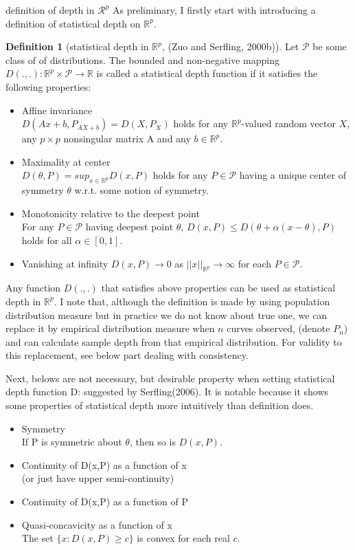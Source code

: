 \documentclass[aspectratio=169,ignorenonframetext,9pt]{beamer}
\theoremstyle{plain}
\theoremstyle{definition}
\newtheorem{defn}{Definition}[section]
\begin{document}
\begin{frame}{definition of depth in $\mathcal{R}^p$}
As preliminary, I firstly start with introducing a definition of statistical depth on $\mathbb{R}^p$.


\begin{defn}[statistical depth in $\mathbb{R}^p$, (Zuo and Serfling, 2000b)]
Let $\mathcal{P}$ be some class of of distributions.
The bounded and non-negative mapping $D(.,.): \mathbb{R}^p\times \mathcal{P} \rightarrow \mathbb{R}$ is called
a statistical depth function if it satisfies the following properties:
\begin{itemize}
    \item Affine invariance \\
        $D(Ax+b,P_{AX+b})=D(X,P_X)$ holds for any $\mathbb{R}^p$-valued random vector $X$,
        any $p\times p$ nonsingular matrix A and any $b\in \mathbb{R}^p$.
    \item Maximality at center \\
        $D(\theta,P)=sup_{x\in\mathbb{R}^p}D(x,P)$ holds for any $P\in\mathcal{P}$
        having a unique center of symmetry $\theta$ w.r.t. some notion of symmetry.
    \item Monotonicity relative to the deepest point \\
        For any $P \in \mathcal{P}$ having deepest point $\theta$, $D(x,P)\leq D(\theta+\alpha(x-\theta), P)$
        holds for all $\alpha\in[0,1]$.
    \item Vanishing at infinity
        $D(x,P)\rightarrow0$ as $||x||_{\mathbb{R}^p}\rightarrow\infty$
        for each $P\in\mathcal{P}$.
\end{itemize}
\end{defn}


Any function $D(.,.)$ that satisfies above properties can be used as statistical depth in $\mathbb{R}^p$.
I note that, although the definition is made by using population distribution measure but
in practice we do not know about true one, we can replace it by empirical distribution measure when $n$ curves observed,
(denote $P_n$) and can calculate sample depth from that empirical distribution. 
For validity to this replacement, see below part dealing with consistency.

Next, belows are not necessary, but desirable property when setting statistical depth function D:
suggested by Serfling(2006). It is notable because it shows some properties of statistical depth more intuitively than definition does.
\begin{itemize}
    \item Symmetry \\
        If P is symmetric about $\theta$, then so is $D(x,P)$.
    \item Continuity of D(x,P) as a function of x \\
        (or just have upper semi-continuity)
    \item Continuity of D(x,P) as a function of P
    \item Quasi-concavicity as a function of x \\
        The set $\{x:D(x,P)\geq c\}$ is convex for each real $c$.
\end{itemize}


\end{frame}
\end{document}
